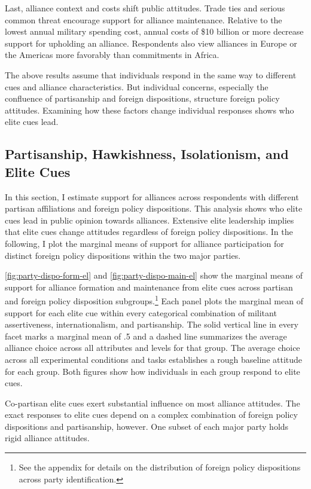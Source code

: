 \documentclass[12pt]{article}
\begin{document}
Last, alliance context and costs shift public attitudes. 
Trade ties and serious common threat encourage support for alliance maintenance. 
Relative to the lowest annual military spending cost, annual costs of \$10 billion or more decrease support for upholding an alliance.  
Respondents also view alliances in Europe or the Americas more favorably than commitments in Africa. 


The above results assume that individuals respond in the same way to different cues and alliance characteristics. 
But individual concerns, especially the confluence of partisanship and foreign dispositions, structure foreign policy attitudes.
Examining how these factors change individual responses shows who elite cues lead.  



\subsection{Partisanship, Hawkishness, Isolationism, and Elite Cues}



In this section, I estimate support for alliances across respondents with different partisan affiliations and foreign policy dispositions.  
This analysis shows who elite cues lead in public opinion towards alliances. 
Extensive elite leadership implies that elite cues change attitudes regardless of foreign policy dispositions. 
In the following, I plot the marginal means of support for alliance participation for distinct foreign policy dispositions within the two major parties.  


\autoref{fig:party-dispo-form-el} and \autoref{fig:party-dispo-main-el} show the marginal means of support for alliance formation and maintenance from elite cues across partisan and foreign policy disposition subgroups.\footnote{See the appendix for details on the distribution of foreign policy dispositions across party identification.} 
Each panel plots the marginal mean of support for each elite cue within every categorical combination of militant assertiveness, internationalism, and partisanship.
The solid vertical line in every facet marks a marginal mean of .5 and a dashed line summarizes the average alliance choice across all attributes and levels for that group.
The average choice across all experimental conditions and tasks establishes a rough baseline attitude for each group.  
Both figures show how individuals in each group respond to elite cues. 


Co-partisan elite cues exert substantial influence on most alliance attitudes.
The exact responses to elite cues depend on a complex combination of foreign policy dispositions and partisanship, however. 
One subset of each major party holds rigid alliance attitudes. 
\end{document}
